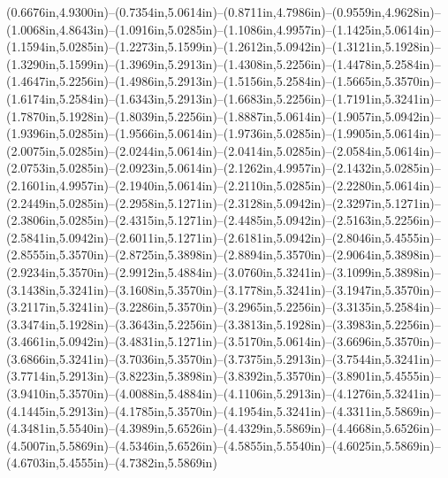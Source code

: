 (0.6676in,4.9300in)--(0.7354in,5.0614in)--(0.8711in,4.7986in)--(0.9559in,4.9628in)--(1.0068in,4.8643in)--(1.0916in,5.0285in)--(1.1086in,4.9957in)--(1.1425in,5.0614in)--(1.1594in,5.0285in)--(1.2273in,5.1599in)--(1.2612in,5.0942in)--(1.3121in,5.1928in)--(1.3290in,5.1599in)--(1.3969in,5.2913in)--(1.4308in,5.2256in)--(1.4478in,5.2584in)--(1.4647in,5.2256in)--(1.4986in,5.2913in)--(1.5156in,5.2584in)--(1.5665in,5.3570in)--(1.6174in,5.2584in)--(1.6343in,5.2913in)--(1.6683in,5.2256in)--(1.7191in,5.3241in)--(1.7870in,5.1928in)--(1.8039in,5.2256in)--(1.8887in,5.0614in)--(1.9057in,5.0942in)--(1.9396in,5.0285in)--(1.9566in,5.0614in)--(1.9736in,5.0285in)--(1.9905in,5.0614in)--(2.0075in,5.0285in)--(2.0244in,5.0614in)--(2.0414in,5.0285in)--(2.0584in,5.0614in)--(2.0753in,5.0285in)--(2.0923in,5.0614in)--(2.1262in,4.9957in)--(2.1432in,5.0285in)--(2.1601in,4.9957in)--(2.1940in,5.0614in)--(2.2110in,5.0285in)--(2.2280in,5.0614in)--(2.2449in,5.0285in)--(2.2958in,5.1271in)--(2.3128in,5.0942in)--(2.3297in,5.1271in)--(2.3806in,5.0285in)--(2.4315in,5.1271in)--(2.4485in,5.0942in)--(2.5163in,5.2256in)--(2.5841in,5.0942in)--(2.6011in,5.1271in)--(2.6181in,5.0942in)--(2.8046in,5.4555in)--(2.8555in,5.3570in)--(2.8725in,5.3898in)--(2.8894in,5.3570in)--(2.9064in,5.3898in)--(2.9234in,5.3570in)--(2.9912in,5.4884in)--(3.0760in,5.3241in)--(3.1099in,5.3898in)--(3.1438in,5.3241in)--(3.1608in,5.3570in)--(3.1778in,5.3241in)--(3.1947in,5.3570in)--(3.2117in,5.3241in)--(3.2286in,5.3570in)--(3.2965in,5.2256in)--(3.3135in,5.2584in)--(3.3474in,5.1928in)--(3.3643in,5.2256in)--(3.3813in,5.1928in)--(3.3983in,5.2256in)--(3.4661in,5.0942in)--(3.4831in,5.1271in)--(3.5170in,5.0614in)--(3.6696in,5.3570in)--(3.6866in,5.3241in)--(3.7036in,5.3570in)--(3.7375in,5.2913in)--(3.7544in,5.3241in)--(3.7714in,5.2913in)--(3.8223in,5.3898in)--(3.8392in,5.3570in)--(3.8901in,5.4555in)--(3.9410in,5.3570in)--(4.0088in,5.4884in)--(4.1106in,5.2913in)--(4.1276in,5.3241in)--(4.1445in,5.2913in)--(4.1785in,5.3570in)--(4.1954in,5.3241in)--(4.3311in,5.5869in)--(4.3481in,5.5540in)--(4.3989in,5.6526in)--(4.4329in,5.5869in)--(4.4668in,5.6526in)--(4.5007in,5.5869in)--(4.5346in,5.6526in)--(4.5855in,5.5540in)--(4.6025in,5.5869in)--(4.6703in,5.4555in)--(4.7382in,5.5869in)
